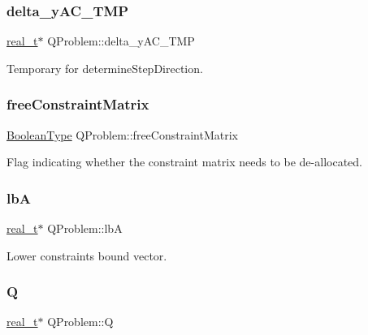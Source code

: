 \subsubsection{\texorpdfstring{delta\+\_\+y\+A\+C\+\_\+\+T\+MP}{delta\_yAC\_TMP}}
{\footnotesize\ttfamily \hyperlink{qp_o_a_s_e_s__wrapper_8h_a0d00e2b3dfadee81331bbb39068570c4}{real\+\_\+t}$\ast$ Q\+Problem\+::delta\+\_\+y\+A\+C\+\_\+\+T\+MP\hspace{0.3cm}{\ttfamily [protected]}}

Temporary for determine\+Step\+Direction. \mbox{\label{class_q_problem_a3a4b41db599d522b459ac0a6065c346c}} 
\subsubsection{\texorpdfstring{free\+Constraint\+Matrix}{freeConstraintMatrix}}
{\footnotesize\ttfamily \hyperlink{_types_8hpp_a20f82124c82b6f5686a7fce454ef9089}{Boolean\+Type} Q\+Problem\+::free\+Constraint\+Matrix\hspace{0.3cm}{\ttfamily [protected]}}

Flag indicating whether the constraint matrix needs to be de-\/allocated. \mbox{\label{class_q_problem_a9326d4986de336d9b1ee22954010e311}} 
\subsubsection{\texorpdfstring{lbA}{lbA}}
{\footnotesize\ttfamily \hyperlink{qp_o_a_s_e_s__wrapper_8h_a0d00e2b3dfadee81331bbb39068570c4}{real\+\_\+t}$\ast$ Q\+Problem\+::lbA\hspace{0.3cm}{\ttfamily [protected]}}

Lower constraints\textquotesingle{} bound vector. \mbox{\label{class_q_problem_aa8bebb2350185cb95782c3bbb98f739f}} 
\subsubsection{\texorpdfstring{Q}{Q}}
{\footnotesize\ttfamily \hyperlink{qp_o_a_s_e_s__wrapper_8h_a0d00e2b3dfadee81331bbb39068570c4}{real\+\_\+t}$\ast$ Q\+Problem\+::Q\hspace{0.3cm}{\ttfamily [protected]}}

